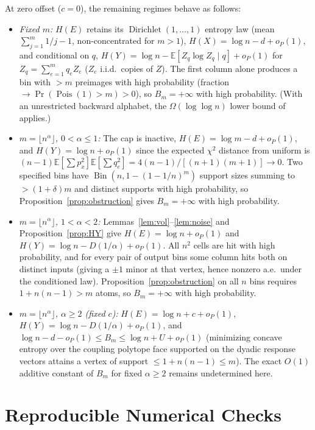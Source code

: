 \documentclass[11pt]{article}
\theoremstyle{plain}
\theoremstyle{definition}
\theoremstyle{remark}
\DeclareMathOperator{\Pois}{Pois}
\DeclareMathOperator{\Bin}{Bin}
\DeclareMathOperator{\Dir}{Dirichlet}
\begin{document}
At zero offset ($c = 0$), the remaining regimes behave as follows:
\begin{itemize}[leftmargin=2em,itemsep=2pt]
\item \emph{Fixed $m$:} $H(E)$ retains its $\Dir(1,\dots,1)$ entropy law (mean $\sum_{j=1}^m 1/j - 1$, non-concentrated for $m > 1$), $H(X) = \log n - d + o_P(1)$, and conditional on $q$, $H(Y) = \log n - \mathbb{E}[Z_q\log Z_q \mid q] + o_P(1)$ for $Z_q = \sum_{e=1}^m q_e Z_e$ ($Z_e$ i.i.d.\ copies of $Z$). The first column alone produces a bin with $> m$ preimages with high probability (fraction $\to \Pr(\Pois(1) > m) > 0$), so $B_m = +\infty$ with high probability. (With an unrestricted backward alphabet, the $\Omega(\log\log n)$ lower bound of~\cite{Compton2020} applies.)
\item \emph{$m = \lfloor n^\alpha \rfloor$, $0 < \alpha \le 1$:} The cap is inactive, $H(E) = \log m - d + o_P(1)$, and $H(Y) = \log n + o_P(1)$ since the expected $\chi^2$ distance from uniform is $(n-1)\mathbb{E}[\sum p_x^2]\mathbb{E}[\sum q_e^2] = 4(n-1)/[(n+1)(m+1)] \to 0$. Two specified bins have $\Bin(n, 1 - (1 - 1/n)^m)$ support sizes summing to $> (1 + \delta)m$ and distinct supports with high probability, so Proposition~\ref{prop:obstruction} gives $B_m = +\infty$ with high probability.
\item \emph{$m = \lfloor n^\alpha \rfloor$, $1 < \alpha < 2$:} Lemmas~\ref{lem:vol}--\ref{lem:noise} and Proposition~\ref{prop:HY} give $H(E) = \log n + o_P(1)$ and $H(Y) = \log n - D(1/\alpha) + o_P(1)$. All $n^2$ cells are hit with high probability, and for every pair of output bins some column hits both on distinct inputs (giving a $\pm 1$ minor at that vertex, hence nonzero a.e.\ under the conditioned law). Proposition~\ref{prop:obstruction} on all $n$ bins requires $1 + n(n-1) > m$ atoms, so $B_m = +\infty$ with high probability.
\item \emph{$m = \lfloor n^\alpha \rfloor$, $\alpha \ge 2$ (fixed $c$):} $H(E) = \log n + c + o_P(1)$, $H(Y) = \log n - D(1/\alpha) + o_P(1)$, and $\log n - d - o_P(1) \le B_m \le \log n + U + o_P(1)$ (minimizing concave entropy over the coupling polytope face supported on the dyadic response vectors attains a vertex of support $\le 1 + n(n-1) \le m$). The exact $O(1)$ additive constant of $B_m$ for fixed $\alpha \ge 2$ remains undetermined here.
\end{itemize}

\section{Reproducible Numerical Checks}
\end{document}
